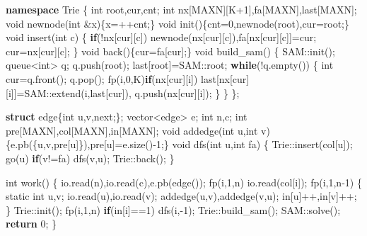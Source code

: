 \documentclass[
]{article}
\newenvironment{Shaded}{}{}
\newcommand{\AttributeTok}[1]{\textcolor[rgb]{0.49,0.56,0.16}{#1}}
\newcommand{\ControlFlowTok}[1]{\textcolor[rgb]{0.00,0.44,0.13}{\textbf{#1}}}
\newcommand{\DataTypeTok}[1]{\textcolor[rgb]{0.56,0.13,0.00}{#1}}
\newcommand{\DecValTok}[1]{\textcolor[rgb]{0.25,0.63,0.44}{#1}}
\newcommand{\KeywordTok}[1]{\textcolor[rgb]{0.00,0.44,0.13}{\textbf{#1}}}
\newcommand{\NormalTok}[1]{#1}
\begin{document}
\begin{Shaded}
\begin{Highlighting}[]
\KeywordTok{namespace}\NormalTok{ Trie}
\NormalTok{\{}
    \DataTypeTok{int}\NormalTok{ root,cur,cnt;}
    \DataTypeTok{int}\NormalTok{ nx[MAXN][K+}\DecValTok{1}\NormalTok{],fa[MAXN],last[MAXN];}
    \DataTypeTok{void}\NormalTok{ newnode(}\DataTypeTok{int}\NormalTok{ \&x)\{x=++cnt;\}}
    \DataTypeTok{void}\NormalTok{ init()\{cnt=}\DecValTok{0}\NormalTok{,newnode(root),cur=root;\}}
    \DataTypeTok{void}\NormalTok{ insert(}\DataTypeTok{int}\NormalTok{ c)}
\NormalTok{    \{}
        \ControlFlowTok{if}\NormalTok{(!nx[cur][c])}
\NormalTok{            newnode(nx[cur][c]),fa[nx[cur][c]]=cur;}
\NormalTok{        cur=nx[cur][c];}
\NormalTok{    \}}
    \DataTypeTok{void}\NormalTok{ back()\{cur=fa[cur];\}}
    \DataTypeTok{void}\NormalTok{ build\_sam()}
\NormalTok{    \{}
\NormalTok{        SAM::init();}
\NormalTok{        queue\textless{}}\DataTypeTok{int}\NormalTok{\textgreater{} q;}
\NormalTok{        q.push(root);}
\NormalTok{        last[root]=SAM::root;}
        \ControlFlowTok{while}\NormalTok{(!q.empty())}
\NormalTok{        \{}
            \DataTypeTok{int}\NormalTok{ cur=q.front(); q.pop();}
\NormalTok{            fp(i,}\DecValTok{0}\NormalTok{,K)}\ControlFlowTok{if}\NormalTok{(nx[cur][i])}
\NormalTok{                last[nx[cur][i]]=SAM::extend(i,last[cur]),}
\NormalTok{                    q.push(nx[cur][i]);}
\NormalTok{        \}}
\NormalTok{    \}}
\NormalTok{\};}

\KeywordTok{struct}\NormalTok{ edge\{}\DataTypeTok{int}\NormalTok{ u,v,next;\};}
\NormalTok{vector\textless{}edge\textgreater{} e;}
\DataTypeTok{int}\NormalTok{ n,c;}
\DataTypeTok{int}\NormalTok{ pre[MAXN],col[MAXN],in[MAXN];}
\DataTypeTok{void}\NormalTok{ addedge(}\DataTypeTok{int}\NormalTok{ u,}\DataTypeTok{int}\NormalTok{ v)\{e.pb(\{u,v,pre[u]\}),pre[u]=e.size(){-}}\DecValTok{1}\NormalTok{;\}}
\DataTypeTok{void}\NormalTok{ dfs(}\DataTypeTok{int}\NormalTok{ u,}\DataTypeTok{int}\NormalTok{ fa)}
\NormalTok{\{}
\NormalTok{    Trie::insert(col[u]);}
\NormalTok{    go(u) }\ControlFlowTok{if}\NormalTok{(v!=fa) dfs(v,u);}
\NormalTok{    Trie::back();}
\NormalTok{\}}

\DataTypeTok{int}\NormalTok{ work()}
\NormalTok{\{}
\NormalTok{    io.read(n),io.read(c),e.pb(edge());}
\NormalTok{    fp(i,}\DecValTok{1}\NormalTok{,n) io.read(col[i]);}
\NormalTok{    fp(i,}\DecValTok{1}\NormalTok{,n{-}}\DecValTok{1}\NormalTok{)}
\NormalTok{    \{}
        \AttributeTok{static} \DataTypeTok{int}\NormalTok{ u,v;}
\NormalTok{        io.read(u),io.read(v);}
\NormalTok{        addedge(u,v),addedge(v,u);}
\NormalTok{        in[u]++,in[v]++;}
\NormalTok{    \}}
\NormalTok{    Trie::init();}
\NormalTok{    fp(i,}\DecValTok{1}\NormalTok{,n) }\ControlFlowTok{if}\NormalTok{(in[i]==}\DecValTok{1}\NormalTok{) dfs(i,{-}}\DecValTok{1}\NormalTok{);}
\NormalTok{    Trie::build\_sam();}
\NormalTok{    SAM::solve();}
    \ControlFlowTok{return} \DecValTok{0}\NormalTok{;}
\NormalTok{\}}
\end{Highlighting}
\end{Shaded}
\end{document}
